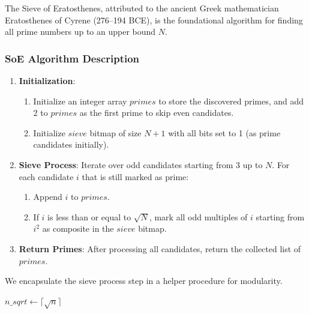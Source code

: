 \documentclass{article}
\begin{document}
The Sieve of Eratosthenes, attributed to the ancient Greek mathematician Eratosthenes of Cyrene (276--194 BCE), is the foundational algorithm for finding all prime numbers up to an upper bound $N$. 

\subsubsection*{SoE Algorithm Description}
\begin{enumerate}[noitemsep]
    \item \textbf{Initialization}: 
    \begin{enumerate}
        \item Initialize an integer array $primes$ to store the discovered primes, and add 2 to $primes$ as the first prime to skip even candidates.
        \item Initialize $sieve$ bitmap of size $N+1$ with all bits set to 1 (as prime candidates initially).
    \end{enumerate}
    \item \textbf{Sieve Process}: Iterate over odd candidates starting from 3 up to $N$. For each candidate $i$ that is still marked as prime: 
    \begin{enumerate}
        \item Append $i$ to $primes$.
        \item If $i$ is less than or equal to $\sqrt{N}$, mark all odd multiples of $i$ starting from $i^2$ as composite in the $sieve$ bitmap.
    \end{enumerate}
    \item \textbf{Return Primes}: After processing all candidates, return the collected list of $primes$.
\end{enumerate}

\medskip
\noindent
We encapsulate the sieve process step in a helper procedure  for modularity.
\begin{algorithmic}[1]
    \label{proc:process_n_bitmap}
        \State {} 
        \State $n\_sqrt \gets \lceil\sqrt{n}\rceil$ 
             
                 
                    \State {} 
                     
                        \State {} 
                    \EndIf
                \EndIf
            \EndFor
    \EndProcedure
\end{algorithmic}
\end{document}

